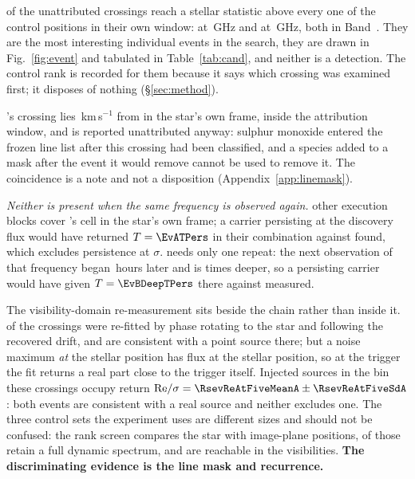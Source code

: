 \NUnattrRankFlagged{} of the \NUnattributed{} unattributed crossings reach a
stellar statistic above every one of the \NCtrl{} control positions in their
own window: \EvAStar{} at \EvAFreq\,GHz and \EvBStar{} at \EvBFreq\,GHz, both
in Band~\EvABand. They are the most interesting individual events in the
search, they are drawn in Fig.~\ref{fig:event} and tabulated in
Table~\ref{tab:cand}, and neither is a detection. The control rank is
recorded for them because it says which crossing was examined first; it
disposes of nothing (\S\ref{sec:method}).

\EvBStar{}'s crossing lies \EvBDv\,km\,s$^{-1}$ from \EvBLine{} in the star's
own frame, inside the attribution window, and is reported unattributed
anyway: sulphur monoxide entered the frozen line list after this crossing had
been classified, and a species added to a mask after the event it would
remove cannot be used to remove it. The coincidence is a note and not a
disposition (Appendix~\ref{app:linemask}).

\emph{Neither is present when the same frequency is observed again.}
\EvANRep{} other execution blocks cover \EvAStar{}'s cell in the star's own
frame; a carrier persisting at the discovery flux would have returned
$T=\EvATPers$ in their combination against \EvATAnyDrift{} found, which
excludes persistence at \EvAExcl$\sigma$. \EvBStar{} needs only one repeat:
the next observation of that frequency began \EvBNearH\,hours later and is
\EvBDeepRatio{} times deeper, so a persisting carrier would have given
$T=\EvBDeepTPers$ there against \EvBDeepTObs{} measured.

The visibility-domain re-measurement sits beside the chain rather than inside
it. \LgNFit{} of the \NCross{} crossings were re-fitted by phase rotating to
the star and following the recovered drift, and \LgNLocalCor{} are consistent
with a point source there; but a noise maximum \emph{at} the stellar position
has flux at the stellar position, so at the trigger the fit returns a real
part close to the trigger itself. Injected sources in the bin these crossings
occupy return ${\rm Re}/\sigma=\RsevReAtFiveMeanA\pm\RsevReAtFiveSdA$: both
events are consistent with a real source and neither excludes one. The three
control sets the experiment uses are different sizes and should not be
confused: the rank screen compares the star with \NCtrl{} image-plane
positions, \RcNRetCtrl{} of those retain a full dynamic spectrum, and
\RcNVisCtrl{} are reachable in the visibilities.
\textbf{The discriminating evidence is the line mask and recurrence.}

